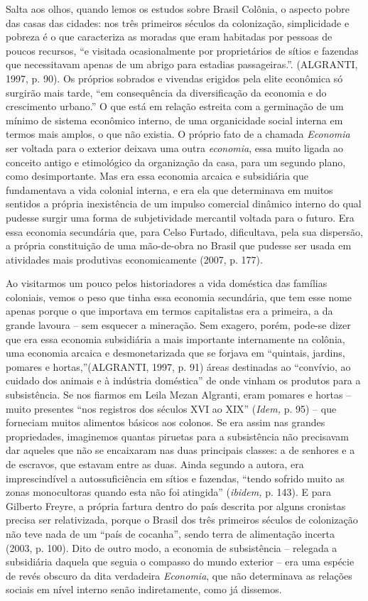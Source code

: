 Salta aos olhos, quando lemos os estudos sobre Brasil Colônia, o aspecto
pobre das casas das cidades: nos três primeiros séculos da colonização,
simplicidade e pobreza é o que caracteriza as moradas que eram habitadas
por pessoas de poucos recursos, ``e visitada ocasionalmente por
proprietários de sítios e fazendas que necessitavam apenas de um abrigo
para estadias passageiras.''. (ALGRANTI, 1997, p. 90). Os próprios
sobrados e vivendas erigidos pela elite econômica só surgirão mais
tarde, ``em consequência da diversificação da economia e do crescimento
urbano.'' O que está em relação estreita com a germinação de um mínimo
de sistema econômico interno, de uma organicidade social interna em
termos mais amplos, o que não existia. O próprio fato de a chamada
\emph{Economia} ser voltada para o exterior deixava uma outra
\emph{economia}, essa muito ligada ao conceito antigo e etimológico da
organização da casa, para um segundo plano, como desimportante. Mas era
essa economia arcaica e subsidiária que fundamentava a vida colonial
interna, e era ela que determinava em muitos sentidos a própria
inexistência de um impulso comercial dinâmico interno do qual pudesse
surgir uma forma de subjetividade mercantil voltada para o futuro. Era
essa economia secundária que, para Celso Furtado, dificultava, pela sua
dispersão, a própria constituição de uma mão-de-obra no Brasil que
pudesse ser usada em atividades mais produtivas economicamente (2007, p.
177).

Ao visitarmos um pouco pelos historiadores a vida doméstica das famílias
coloniais, vemos o peso que tinha essa economia secundária, que tem esse
nome apenas porque o que importava em termos capitalistas era a
primeira, a da grande lavoura -- sem esquecer a mineração. Sem exagero,
porém, pode-se dizer que era essa economia subsidiária a mais importante
internamente na colônia, uma economia arcaica e desmonetarizada que se
forjava em ``quintais, jardins, pomares e hortas,''(ALGRANTI, 1997, p.
91) áreas destinadas ao ``convívio, ao cuidado dos animais e à indústria
doméstica'' de onde vinham os produtos para a subsistência. Se nos
fiarmos em Leila Mezan Algranti, eram pomares e hortas -- muito
presentes ``nos registros dos séculos XVI ao XIX'' (\emph{Idem,} p. 95)
-- que forneciam muitos alimentos básicos aos colonos. Se era assim nas
grandes propriedades, imaginemos quantas piruetas para a subsistência
não precisavam dar aqueles que não se encaixaram nas duas principais
classes: a de senhores e a de escravos, que estavam entre as duas. Ainda
segundo a autora, era imprescindível a autossuficiência em sítios e
fazendas, ``tendo sofrido muito as zonas monocultoras quando esta não
foi atingida'' (\emph{ibidem,} p. 143). E para Gilberto Freyre, a
própria fartura dentro do país descrita por alguns cronistas precisa ser
relativizada, porque o Brasil dos três primeiros séculos de colonização
não teve nada de um ``país de cocanha'', sendo terra de alimentação
incerta (2003, p. 100). Dito de outro modo, a economia de subsistência
-- relegada a subsidiária daquela que seguia o compasso do mundo
exterior -- era uma espécie de revés obscuro da dita verdadeira
\emph{Economia}, que não determinava as relações sociais em nível
interno senão indiretamente, como já dissemos.

